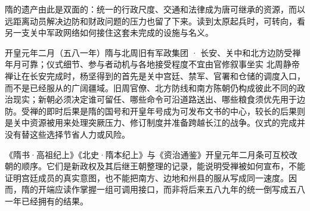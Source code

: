 隋的遗产由此是双面的：统一的行政尺度、交通和法律成为唐可继承的资源，而以远距离动员解决边防和财政问题的压力也留了下来。读到太原起兵时，可转向，看另一支关中军政网络如何接住这套未完成的设施与名义。

\begin{event}{}{开皇元年二月（五八一年）}{隋与北周旧有军政集团 · 长安、关中和北方边防}{受禅年月可靠；仪式细节、参与者动机与各地接受程度不宜由官修叙事坐实}
北周静帝禅让在长安完成时，杨坚得到的首先是关中宫廷、禁军、官署和仓储的调度入口，而不是已经服从的广阔疆域。旧周官僚、北方防线和南方陈朝仍构成彼此不同的政治现实；新朝必须决定谁可留任、哪些命令可沿道路送出、哪些粮食须优先用于边防。受禅的即时后果是隋的国号和开皇年号成为可发布文书的中心，较长的后果则是关中资源被用来处理突厥压力、修订制度并准备跨越长江的战争。仪式的完成并没有替这些选择节省人力或风险。

《隋书·高祖纪上》《北史·隋本纪上》与《资治通鉴》开皇元年二月条可互校改朝的顺序。它们是新政权及其后继王朝整理的记录，能说明受禅被如何宣布，不能证明宫廷成员的真实意图，也不能把南方、边地和州县的服从写成同一速度。因而，隋的开端应读作掌握一组可调用接口，而非将后来五八九年的统一倒写成五八一年已经拥有的结果。
\end{event}

